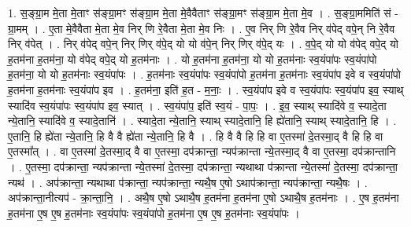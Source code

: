 \documentclass[17pt]{extarticle}
\begin{document}
1. स॒ङ्ग्रा॒म मे॒ता मे॒ताꣳ स॑ङ्ग्रा॒मꣳ स॑ङ्ग्रा॒म मे॒ता मे॒वैवैताꣳ स॑ङ्ग्रा॒मꣳ स॑ङ्ग्रा॒म मे॒ता मे॒व । . स॒ङ्ग्रा॒ममिति॑ सं - ग्रा॒मम् । . ए॒ता मे॒वैवैता मे॒ता मे॒व निर् णि रे॒वैता मे॒ता मे॒व निः । . ए॒व निर् णि रे॒वैव निर् व॑पेद् वपे॒न् नि रे॒वैव निर् व॑पेत् । . निर् व॑पेद् वपे॒न् निर् णिर् व॑पे॒द् यो यो व॑पे॒न् निर् णिर् व॑पे॒द् यः । . व॒पे॒द् यो यो व॑पेद् वपे॒द् यो ह॒तम॑ना ह॒तम॑ना॒ यो व॑पेद् वपे॒द् यो ह॒तम॑नाः । . यो ह॒तम॑ना ह॒तम॑ना॒ यो यो ह॒तम॑नाः स्व॒यंपा॑पः स्व॒यंपा॑पो ह॒तम॑ना॒ यो यो ह॒तम॑नाः स्व॒यंपा॑पः । . ह॒तम॑नाः स्व॒यंपा॑पः स्व॒यंपा॑पो ह॒तम॑ना ह॒तम॑नाः स्व॒यंपा॑प इवे व स्व॒यंपा॑पो ह॒तम॑ना ह॒तम॑नाः स्व॒यंपा॑प इव । . ह॒तम॑ना॒ इति॑ ह॒त - म॒नाः॒ । . स्व॒यंपा॑प इवे व स्व॒यंपा॑पः स्व॒यंपा॑प इव॒ स्याथ् स्यादि॑व स्व॒यंपा॑पः स्व॒यंपा॑प इव॒ स्यात् । . स्व॒यंपा॑प॒ इति॑ स्व॒यं - पा॒पः॒ । . इ॒व॒ स्याथ् स्यादि॑वे व॒ स्यादे॒ता न्ये॒तानि॒ स्यादि॑वे व॒ स्यादे॒तानि॑ । . स्यादे॒ता न्ये॒तानि॒ स्याथ् स्यादे॒तानि॒ हि ह्ये॑तानि॒ स्याथ् स्यादे॒तानि॒ हि । . ए॒तानि॒ हि ह्ये॑ता न्ये॒तानि॒ हि वै वै ह्ये॑ता न्ये॒तानि॒ हि वै । . हि वै वै हि हि वा ए॒तस्मा॑ दे॒तस्मा॒द् वै हि हि वा ए॒तस्मा᳚त् । . वा ए॒तस्मा॑ दे॒तस्मा॒द् वै वा ए॒तस्मा॒ दप॑क्रान्ता॒ न्यप॑क्रान्ता न्ये॒तस्मा॒द् वै वा ए॒तस्मा॒ दप॑क्रान्तानि । . ए॒तस्मा॒ दप॑क्रान्ता॒ न्यप॑क्रान्ता न्ये॒तस्मा॑ दे॒तस्मा॒ दप॑क्रान्ता॒ न्यथाथा प॑क्रान्ता न्ये॒तस्मा॑ दे॒तस्मा॒ दप॑क्रान्ता॒ न्यथ॑ । . अप॑क्रान्ता॒ न्यथाथा प॑क्रान्ता॒ न्यप॑क्रान्ता॒ न्यथै॒ष ए॒षो ऽथाप॑क्रान्ता॒ न्यप॑क्रान्ता॒ न्यथै॒षः । . अप॑क्रान्ता॒नीत्यप॑ - क्रा॒न्ता॒नि॒ । . अथै॒ष ए॒षो ऽथाथै॒ष ह॒तम॑ना ह॒तम॑ना ए॒षो ऽथाथै॒ष ह॒तम॑नाः । . ए॒ष ह॒तम॑ना ह॒तम॑ना ए॒ष ए॒ष ह॒तम॑नाः स्व॒यंपा॑पः स्व॒यंपा॑पो ह॒तम॑ना ए॒ष ए॒ष ह॒तम॑नाः स्व॒यंपा॑पः । \newline
\end{document}

